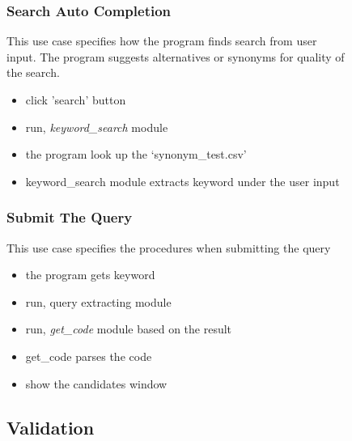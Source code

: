 \documentclass[conference]{IEEEtran}
\begin{document}
\begin{itemize}
\begin{itemize}
\begin{itemize}
\begin{itemize}
\begin{figure}[h]
\begin{enumerate}
\begin{itemize}
\begin{enumerate}
\subsubsection{Search Auto Completion}
This use case specifies how the program finds search from user input. The program suggests alternatives or synonyms for quality of the search.
\begin{itemize}
  \item click 'search' button
  \item run, \textit{keyword\_search} module
  \item the program look up the `synonym\_test.csv'
  \item keyword\_search module extracts keyword under the user input
\end{itemize}
\textit{}

\subsubsection{Submit The Query}
This use case specifies the procedures when submitting the query
\begin{itemize}
  \item the program gets keyword
  \item run, query extracting module
  \item run, \textit{get\_code} module based on the result
  \item get\_code parses the code
  \item show the candidates window
\end{itemize}
\textit{}

\subsection{Validation}


\end{enumerate}
\end{itemize}
\end{enumerate}
\end{figure}
\end{itemize}
\end{itemize}
\end{itemize}
\end{itemize}
\end{document}
